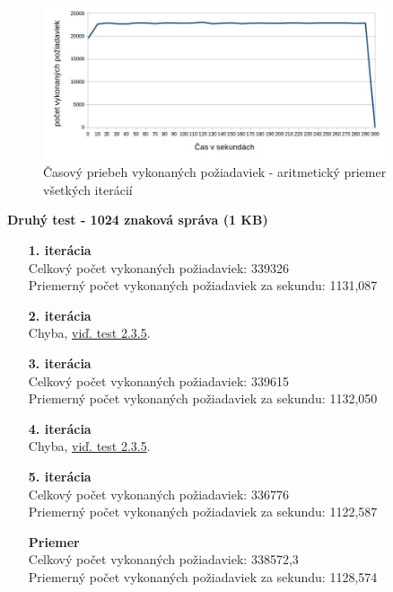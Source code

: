 \documentclass[12pt,oneside,final]{fithesis-utf8}
\begin{document}
\begin{itemize}
\begin{figure}[H]
  \centering
      \includegraphics[width=0.9\textwidth]{faban3_1_distr.jpg}
  \caption{Časový priebeh vykonaných požiadaviek - aritmetický priemer všetkých iterácií}
\end{figure}

\textbf{Druhý test - 1024 znaková správa (1 KB)}
\begin{itemize}

\item[\textbf{1. iterácia}]\ \\
Celkový počet vykonaných požiadaviek: 339326\\
Priemerný počet vykonaných požiadaviek za sekundu: 1131,087

\item[\textbf{2. iterácia}]\ \\
Chyba, \hyperlink{label}{viď. test 2.3.5}.

\item[\textbf{3. iterácia}]\ \\
Celkový počet vykonaných požiadaviek: 339615\\
Priemerný počet vykonaných požiadaviek za sekundu: 1132,050

\item[\textbf{4. iterácia}]\ \\
Chyba, \hyperlink{label}{viď. test 2.3.5}.

\item[\textbf{5. iterácia}]\ \\
Celkový počet vykonaných požiadaviek: 336776\\
Priemerný počet vykonaných požiadaviek za sekundu: 1122,587

\item[\textbf{Priemer}]\ \\
Celkový počet vykonaných požiadaviek: 338572,3\\
Priemerný počet vykonaných požiadaviek za sekundu: 1128,574

\end{itemize}


\end{itemize}
\end{document}
